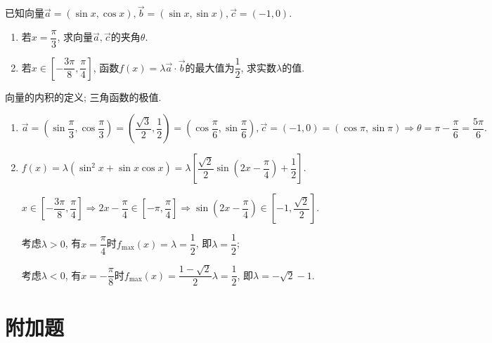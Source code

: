\documentclass[8pt]{article}
\begin{document}
		\begin{easonbigproblem}
			已知向量\(\vec{a} = (\sin x, \cos x), \vec{b} = (\sin x, \sin x), \vec{c} = (-1, 0)\).
			\begin{enumerate} [label = \calword{(\arabic*)}]
				\item 若\(x = \dfrac{\pi}{3}\), 求向量\(\vec{a}, \vec{c}\)的夹角\(\theta\).
				\item 若\(x \in \left[-\dfrac{3\pi}{8}, \dfrac{\pi}{4}\right]\), 函数\(f(x) = \lambda \vec{a} \cdot \vec{b}\)的最大值为\(\dfrac{1}{2}\), 求实数\(\lambda\)的值.
			\end{enumerate}
			\subbigproblem
			 向量的内积的定义; 三角函数的极值.
			\begin{enumerate} [label = \calword{(\arabic*)}]
				\item \(\vec{a} = \left(\sin \dfrac{\pi}{3}, \cos \dfrac{\pi}{3}\right) = \left(\dfrac{\sqrt{3}}{2}, \dfrac{1}{2}\right) = \left(\cos \dfrac{\pi}{6}, \sin \dfrac{\pi}{6}\right), \vec{c} = (-1, 0) = \left(\cos \pi, \sin \pi\right) \Rightarrow \theta = \pi - \dfrac{\pi}{6} = \dfrac{5\pi}{6}.\)
				\item \(f(x) = \lambda \left(\sin^2 x + \sin x \cos x\right) = \lambda \left[\dfrac{\sqrt{2}}{2} \sin \left(2x - \dfrac{\pi}{4}\right) + \dfrac{1}{2}\right]\).
				
				\(x \in \left[-\dfrac{3\pi}{8}, \dfrac{\pi}{4}\right] \Rightarrow 2x - \dfrac{\pi}{4} \in \left[-\pi, \dfrac{\pi}{4}\right] \Rightarrow \sin \left(2x - \dfrac{\pi}{4}\right) \in \left[-1, \dfrac{\sqrt{2}}{2}\right].\)
				
				考虑\(\lambda > 0\), 有\(x = \dfrac{\pi}{4}\)时\(f_{\max}(x)=\lambda=\dfrac{1}{2}\), 即\(\lambda = \dfrac{1}{2}\);
				
				考虑\(\lambda < 0\), 有\(x = -\dfrac{\pi}{8}\)时\(f_{\max}(x) = \dfrac{1 - \sqrt{2}}{2} \lambda = \dfrac{1}{2}\), 即\(\lambda = -\sqrt{2} - 1\).
			\end{enumerate}
		\end{easonbigproblem}

	\section{附加题}
\end{document}
